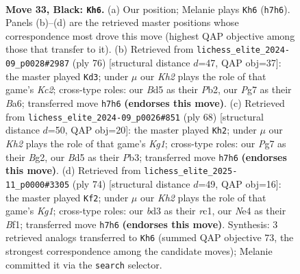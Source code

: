 \documentclass[11pt]{article}
\begin{document}
\clearpage

\begin{figure}[p]\centering
\begin{subfigure}{0.46\textwidth}\centering
\resizebox{\linewidth}{!}{%
\newchessgame
\chessboard[
  setfen={2R5/5ppk/4p3/1p1b3p/1r1PnP1P/3BP1P1/8/3N2K1 b - - 5 33},
  showmover=false,
  pgfstyle=straightmove, color=movearrow, markmove={h7-h6}
]}
\caption{}
\end{subfigure}\hfill
\begin{subfigure}{0.46\textwidth}\centering
\resizebox{\linewidth}{!}{%
\newchessgame
\chessboard[
  setfen={6k1/2r2p2/B5p1/p5Pp/bp2Pp1P/1N3P2/1PK5/4R3 w - - 1 39},
  showmover=false,
  pgfstyle=straightmove, color=movearrow, markmove={c2-d3}
]}
\caption{}
\end{subfigure}
\\[4pt]
\begin{subfigure}{0.46\textwidth}\centering
\resizebox{\linewidth}{!}{%
\newchessgame
\chessboard[
  setfen={6k1/pb1R1p2/1p2pp2/7p/P3P3/1P4PP/5PB1/2r3K1 w - - 2 35},
  showmover=false,
  pgfstyle=straightmove, color=movearrow, markmove={g1-h2}
]}
\caption{}
\end{subfigure}\hfill
\begin{subfigure}{0.46\textwidth}\centering
\resizebox{\linewidth}{!}{%
\newchessgame
\chessboard[
  setfen={5k2/1b3pp1/1P1n3p/p2PN3/1p2P3/1R3PPP/8/2r2BK1 w - - 0 38},
  showmover=false,
  pgfstyle=straightmove, color=movearrow, markmove={g1-f2}
]}
\caption{}
\end{subfigure}
\caption{\textbf{Move 33, Black: \texttt{Kh6}.} (a) Our position; Melanie plays \texttt{Kh6} (\texttt{h7h6}). Panels (b)--(d) are the retrieved master positions whose correspondence most drove this move (highest QAP objective among those that transfer to it). (b) Retrieved from \texttt{lichess\_elite\_2024-09\_p0028\#2987} (ply 76) [structural distance $d$=47, QAP obj=37]: the master played \texttt{Kd3}; under $\mu$ our \emph{Kh2} plays the role of that game's \emph{Kc2}; cross-type roles: our \emph{B}d5 as their \emph{P}b2, our \emph{P}g7 as their \emph{B}a6; transferred move \texttt{h7h6} \textbf{(endorses this move)}. (c) Retrieved from \texttt{lichess\_elite\_2024-09\_p0026\#851} (ply 68) [structural distance $d$=50, QAP obj=20]: the master played \texttt{Kh2}; under $\mu$ our \emph{Kh2} plays the role of that game's \emph{Kg1}; cross-type roles: our \emph{P}g7 as their \emph{B}g2, our \emph{B}d5 as their \emph{P}b3; transferred move \texttt{h7h6} \textbf{(endorses this move)}. (d) Retrieved from \texttt{lichess\_elite\_2025-11\_p0000\#3305} (ply 74) [structural distance $d$=49, QAP obj=16]: the master played \texttt{Kf2}; under $\mu$ our \emph{Kh2} plays the role of that game's \emph{Kg1}; cross-type roles: our \emph{b}d3 as their \emph{r}c1, our \emph{N}e4 as their \emph{B}f1; transferred move \texttt{h7h6} \textbf{(endorses this move)}. Synthesis: 3 retrieved analogs transferred to \texttt{Kh6} (summed QAP objective 73, the strongest correspondence among the candidate moves); Melanie committed it via the \texttt{search} selector.}
\label{fig:thought-m65}
\end{figure}
\end{document}
